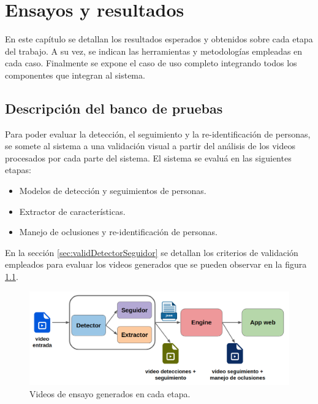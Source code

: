 
\chapter{Ensayos y resultados} %

\label{Chapter4} %

En este capítulo se detallan los resultados esperados y obtenidos sobre cada etapa del trabajo. A su vez, se indican las herramientas y metodologías empleadas en cada caso. Finalmente se expone el caso de uso completo integrando todos los componentes que integran al sistema.


\section{Descripción del banco de pruebas}
\label{sec:bancoPruebas}

Para poder evaluar la detección, el seguimiento y la re-identificación de personas, se somete al sistema a una validación visual a partir del análisis de los videos procesados por cada parte del sistema. El sistema se evaluá en las siguientes etapas:

\begin{itemize}
\item Modelos de detección y seguimientos de personas.
\item Extractor de características.
\item Manejo de oclusiones y re-identificación de personas.
\end{itemize}

En la sección \ref{sec:validDetectorSeguidor} se detallan los criterios de validación empleados para evaluar los videos generados que se pueden observar en la figura \ref{fig:bancoPruebas}.

\begin{figure}[ht]
	\centering
	\includegraphics[scale=.50]{./Figures/bancoPruebas.png}
	\caption{Videos de ensayo generados en cada etapa.}
	\label{fig:bancoPruebas}
\end{figure}



